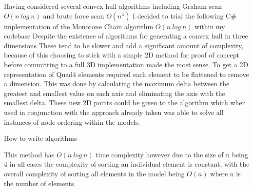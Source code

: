 Having considered several convex hull algorithms including Graham scan \cite{GrahamScan} $O(n\ log\ n)$ and brute force scan $O(n^4)$ \cite{ConvexHulls} \cite{BruteConvex} I decided to trial the following C\# implementation of the Monotone Chain algorithm $O(n\ log\ n)$ within my codebase \cite{CSharpConvexHull}
Despite the existence of algorithms for generating a convex hull in three dimensions These tend to be slower and add a significant amount of complexity, because of this choosing to stick with a simple 2D method for proof of concept before committing to a full 3D implementation made the most sense. To get a 2D representation of Quad4 elements required each element to be flattened to remove a dimension. This was done by calculating the maximum delta between the greatest and smallest value on each axis and eliminating the axis with the smallest delta. These new 2D points could be given to the algorithm which when used in conjunction with the approach already taken was able to solve all instances of node ordering within the models. \\ 

\begin{algorithm}[H]
 \caption{How to write algorithms}
\end{algorithm}



\noindent
This method has $O(n\ log\ n)$ time complexity however due to the size of n being 4 in all cases the complexity of sorting an individual element is constant, with the overall complexity of sorting all elements in the model being $O(n)$ where n is the number of elements. \\ 


